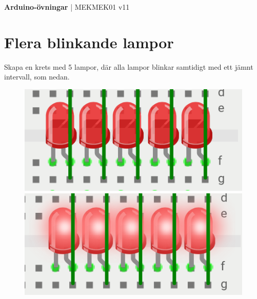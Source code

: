 \documentclass[11pt]{article}
\begin{document}
\begin{center}
      \textbf{\huge{Arduino-övningar}}
      \huge{| MEKMEK01 v11}
\end{center}
\raggedright{}
\begin{center}
\end{center}

\section{Flera blinkande lampor}\label{sec:flera-lampor}
Skapa en krets med 5 lampor, där alla lampor blinkar samtidigt med ett jämnt
intervall, som nedan.
\begin{figure}[H]
\end{figure}
\begin{figure}[H]
      \centering
      \begin{minipage}{0.4\textwidth}
            \includegraphics[width=\textwidth]{5led-low}
      \end{minipage}
      \begin{minipage}{0.4\textwidth}
            \includegraphics[width=\textwidth]{5led-high}
      \end{minipage}
\end{figure}
\end{document}
